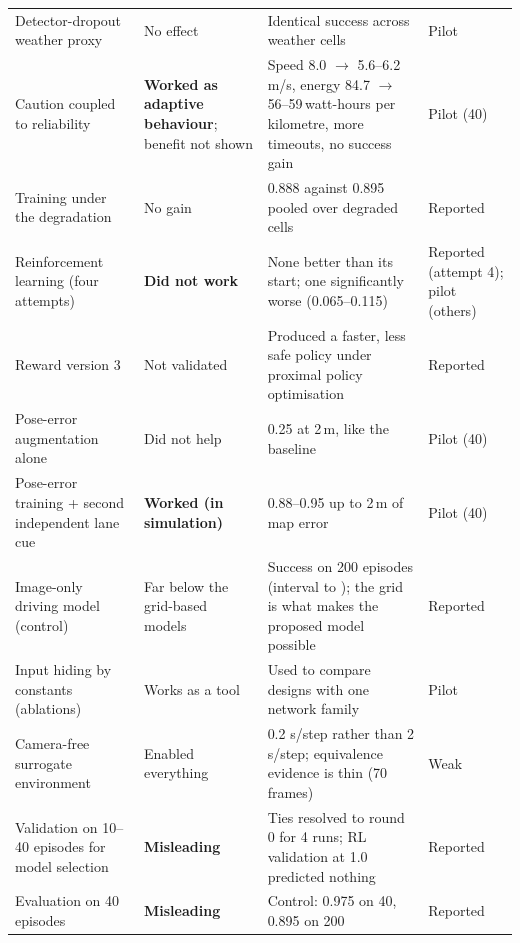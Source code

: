 \begin{table}[H]
\begin{tabularx}{\textwidth}{@{}>{\raggedright\arraybackslash}p{4.2cm}>{\raggedright\arraybackslash}p{1.9cm}X>{\raggedright\arraybackslash}p{1.9cm}@{}}
Detector-dropout weather proxy & No effect & Identical success across weather cells & Pilot\\
Caution coupled to reliability & \textbf{Worked as adaptive behaviour}; benefit not shown & Speed 8.0 $\to$ 5.6--6.2\,m/s, energy 84.7 $\to$ 56--59\,watt-hours per kilometre, more timeouts, no success gain & Pilot (40)\\
Training under the degradation & No gain & 0.888 against 0.895 pooled over degraded cells & Reported\\
Reinforcement learning (four attempts) & \textbf{Did not work} & None better than its start; one significantly worse (0.065--0.115) & Reported (attempt 4); pilot (others)\\
Reward version 3 & Not validated & Produced a faster, less safe policy under proximal policy optimisation & Reported\\
Pose-error augmentation alone & Did not help & 0.25 at 2\,m, like the baseline & Pilot (40)\\
Pose-error training + second independent lane cue & \textbf{Worked (in simulation)} & 0.88--0.95 up to 2\,m of map error & Pilot (40)\\
Image-only driving model (control) & Far below the grid-based models & Success \ImOnSuccess{} on 200 episodes (interval \ImOnLow{} to \ImOnHigh{}); the grid is what makes the proposed model possible & Reported\\
Input hiding by constants (ablations) & Works as a tool & Used to compare designs with one network family & Pilot\\
Camera-free surrogate environment & Enabled everything & 0.2 s/step rather than 2 s/step; equivalence evidence is thin (70 frames) & Weak\\
Validation on 10--40 episodes for model selection & \textbf{Misleading} & Ties resolved to round 0 for 4 runs; RL validation at 1.0 predicted nothing & Reported\\
Evaluation on 40 episodes & \textbf{Misleading} & Control: 0.975 on 40, 0.895 on 200 & Reported\\\bottomrule
\end{tabularx}
\end{table}

